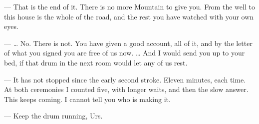 \ornament

\begin{room}

--- That is the end of it. There is no more Mountain to give you. From the well to this house is the whole of the road, and the rest you have watched with your own eyes.

--- \ldots{} No. There is not. You have given a good account, all of it, and by the letter of what you signed you are free of us now. \ldots{} And I would send you up to your bed, if that drum in the next room would let any of us rest.

--- It has not stopped since the early second stroke. Eleven minutes, each time. At both ceremonies I counted five, with longer waits, and then the slow answer. This keeps coming. I cannot tell you who is making it.

--- Keep the drum running, Urs.

\end{room}

\ornament
